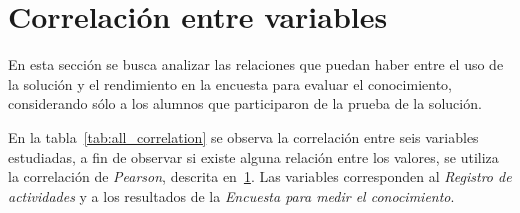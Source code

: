 \section{Correlación entre variables}
\label{sec:correlacion}

En esta sección se busca analizar las relaciones que puedan haber entre 
el uso de la solución y el rendimiento en la encuesta para evaluar el conocimiento, 
considerando sólo a los alumnos que participaron de la prueba de la solución.

En la tabla~\ref{tab:all_correlation} se observa la correlación entre seis 
variables estudiadas, a fin de observar si existe alguna relación entre los
valores, se utiliza la correlación de \emph{Pearson}, descrita
en~\ref{sec:correlacion}. Las variables corresponden al \emph{Registro de actividades} 
y a los resultados de la \emph{Encuesta para medir el conocimiento}.


